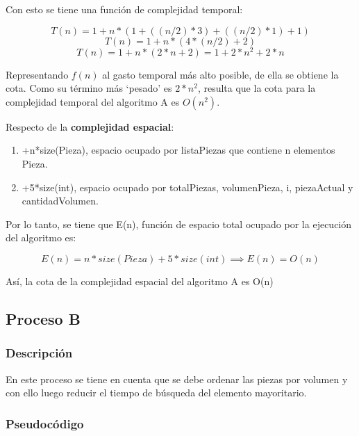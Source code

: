 \documentclass{article}
\begin{document}
Con esto se tiene una función de complejidad temporal:

\begin{equation}
    T(n) = 1 + n*( 1 + ((n/2)*3) + ((n/2)*1) + 1 )
\end{equation}
\begin{equation}
    T(n) = 1 + n* ( 4*(n/2) + 2 ) 
\end{equation}
\begin{equation}
    T(n) =  1 + n*(2*n+2) = 1 + 2*n^2 + 2*n
\end{equation}

Representando \(f(n)\) al gasto temporal más alto posible, de ella se obtiene la cota. 
Como su término más ‘pesado’ es \(2*n^2\), resulta que la cota para la complejidad temporal 
del algoritmo A es \(O(n^2)\).

Respecto de la \textbf{complejidad espacial}:

\begin{enumerate}
    \item +n*size(Pieza), espacio ocupado por listaPiezas que contiene n elementos Pieza.
    \item +5*size(int), espacio ocupado por totalPiezas, volumenPieza, i, piezaActual y cantidadVolumen.
\end{enumerate}

Por lo tanto, se tiene que E(n), función de espacio total ocupado por la ejecución del algoritmo es:

\begin{equation}
    E(n) = n*size(Pieza) + 5*size(int) \implies E(n) = O(n)
\end{equation}

Así, la cota de la complejidad espacial del algoritmo A es O(n)


\newpage
\subsection{Proceso B}
\subsubsection{Descripción}
En este proceso se tiene en cuenta que se debe ordenar las piezas por volumen y con ello luego reducir el tiempo de búsqueda del elemento mayoritario.

\subsubsection{Pseudocódigo}
\end{document}
